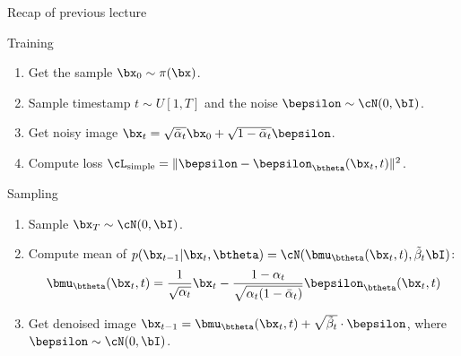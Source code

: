 \begin{frame}{Recap of previous lecture}
	\begin{block}{Training}
		\begin{enumerate}
			\item Get the sample $\bx_0 \sim \pi(\bx)$.
			\item Sample timestamp $t \sim U[1, T]$ and the noise $\bepsilon \sim \cN(0, \bI)$.
			\item Get noisy image $\bx_t = \sqrt{\bar{\alpha}_t} \bx_0 + \sqrt{1 - \bar{\alpha}_t} \bepsilon$.
			\item Compute loss $ \cL_{\text{simple}} = \| \bepsilon - \bepsilon_{\btheta}(\bx_t , t) \|^2 $.
		\end{enumerate}
	\end{block}
	\begin{block}{Sampling}
		\begin{enumerate}
			\item Sample $\bx_T \sim \cN(0, \bI)$.
			\item Compute mean of $p(\bx_{t-1} | \bx_t, \btheta) = \cN(\bmu_{\btheta}(\bx_t, t), \tilde{\beta}_t \bI)$:
			\[
				\bmu_{\btheta}(\bx_t, t) = \frac{1}{\sqrt{\alpha_t}} \bx_t - \frac{1 - \alpha_t}{\sqrt{\alpha_t (1 - \bar{\alpha}_t)}} \bepsilon_{\btheta}(\bx_t, t)
			\]
			\vspace{-0.3cm}
			\item Get denoised image $\bx_{t - 1} = \bmu_{\btheta}(\bx_t, t) +  \sqrt{\tilde{\beta}_t} \cdot \bepsilon$, where $\bepsilon \sim \cN(0, \bI)$.
		\end{enumerate}
	\end{block}
\end{frame}
